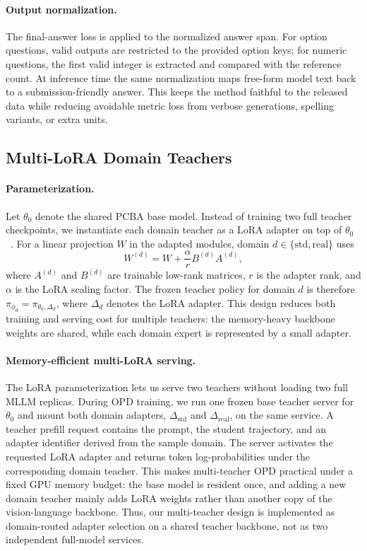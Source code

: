 \documentclass[sigconf, screen, review, anonymous]{acmart}
\begin{document}
\paragraph{Output normalization.}
The final-answer loss is applied to the normalized answer span. For option questions, valid outputs are restricted to the provided option keys; for numeric questions, the first valid integer is extracted and compared with the reference count. At inference time the same normalization maps free-form model text back to a submission-friendly answer. This keeps the method faithful to the released data while reducing avoidable metric loss from verbose generations, spelling variants, or extra units.

\subsection{Multi-LoRA Domain Teachers}
\label{subsec:teachers}

\paragraph{Parameterization.}
Let $\theta_0$ denote the shared PCBA base model. Instead of training two full teacher checkpoints, we instantiate each domain teacher as a LoRA adapter on top of $\theta_0$~\cite{hu2021lora}. For a linear projection $W$ in the adapted modules, domain $d\in\{\mathrm{std},\mathrm{real}\}$ uses
\begin{equation}
W^{(d)} = W + \frac{\alpha}{r} B^{(d)} A^{(d)},
\label{eq:lora}
\end{equation}
where $A^{(d)}$ and $B^{(d)}$ are trainable low-rank matrices, $r$ is the adapter rank, and $\alpha$ is the LoRA scaling factor. The frozen teacher policy for domain $d$ is therefore $\pi_{\phi_d}=\pi_{\theta_0,\Delta_d}$, where $\Delta_d$ denotes the LoRA adapter. This design reduces both training and serving cost for multiple teachers: the memory-heavy backbone weights are shared, while each domain expert is represented by a small adapter.

\paragraph{Memory-efficient multi-LoRA serving.}
The LoRA parameterization lets us serve two teachers without loading two full MLLM replicas. During OPD training, we run one frozen base teacher server for $\theta_0$ and mount both domain adapters, $\Delta_{\mathrm{std}}$ and $\Delta_{\mathrm{real}}$, on the same service. A teacher prefill request contains the prompt, the student trajectory, and an adapter identifier derived from the sample domain. The server activates the requested LoRA adapter and returns token log-probabilities under the corresponding domain teacher. This makes multi-teacher OPD practical under a fixed GPU memory budget: the base model is resident once, and adding a new domain teacher mainly adds LoRA weights rather than another copy of the vision-language backbone. Thus, our multi-teacher design is implemented as domain-routed adapter selection on a shared teacher backbone, not as two independent full-model services.
\end{document}
